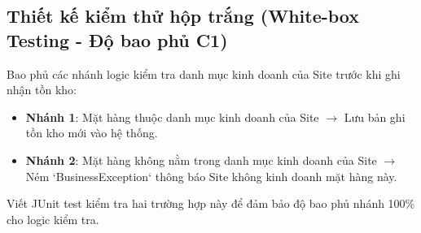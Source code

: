 \documentclass[12pt]{extreport}
\begin{document}
\subsection{Thiết kế kiểm thử hộp trắng (White-box Testing - Độ bao phủ C1)}
Bao phủ các nhánh logic kiểm tra danh mục kinh doanh của Site trước khi ghi nhận tồn kho:
\begin{itemize}
    \item \textbf{Nhánh 1}: Mặt hàng thuộc danh mục kinh doanh của Site $\rightarrow$ Lưu bản ghi tồn kho mới vào hệ thống.
    \item \textbf{Nhánh 2}: Mặt hàng không nằm trong danh mục kinh doanh của Site $\rightarrow$ Ném `BusinessException` thông báo Site không kinh doanh mặt hàng này.
\end{itemize}
Viết JUnit test kiểm tra hai trường hợp này để đảm bảo độ bao phủ nhánh 100\% cho logic kiểm tra.
\end{document}
